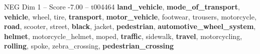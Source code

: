 \begin{textsample}{NEG Dim 1 – Score -7.00 – t004464}  \label{ex:f1_neg_002}
\textbf{land\_vehicle}, \textbf{mode\_of\_transport}, \textbf{vehicle}, wheel, tire, \textbf{transport}, \textbf{motor\_vehicle}, footwear, trousers, motorcycle, \textbf{road}, scooter, street, \textbf{black}, jacket, \textbf{pedestrian}, \textbf{automotive\_wheel\_system}, \textbf{helmet}, motorcycle\_helmet, moped, \textbf{traffic}, sidewalk, \textbf{travel}, motorcycling, \textbf{rolling}, spoke, zebra\_crossing, \textbf{pedestrian\_crossing}

\end{textsample}
